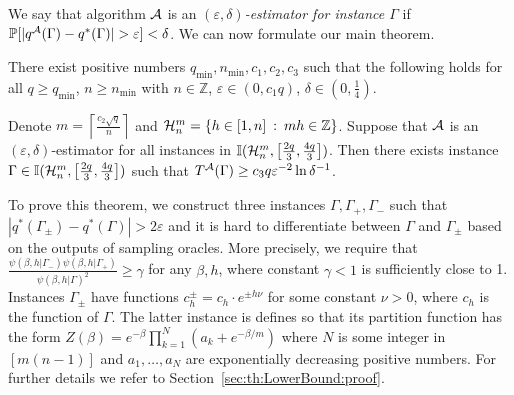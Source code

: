 \documentclass[final,12pt]{colt2018}
\def\P{{\mathbb P}}
\def\calA{{\cal A}}
\def\calH{{\cal H}}
\begin{document}
We say that algorithm $\calA$ is an {\em $(\varepsilon,\delta)$-estimator for instance $\Gamma$}
if $\P[|q^{\calA}(\Gamma)-q^\ast(\Gamma)|> \varepsilon]<\delta$. 
We can now formulate our main theorem.
\begin{theorem}\label{th:LowerBound}
There exist positive numbers $q_{\min},n_{\min},c_1,c_2,c_3$ such that the following holds for all 
$q\ge q_{\min}$,
$n\ge n_{\min}$ with $n\in\mathbb Z$, 
$\varepsilon\in(0,c_1 q)$, $\delta\in(0,\frac{1}{4})$.

Denote $m=\left\lceil \frac{c_2\sqrt{q}}{n} \right\rceil$ and $\calH_n^m=\{h\in[1,n]\::\:mh\in\mathbb Z\}$.
Suppose that $\calA$ is an $(\varepsilon,\delta)$-estimator for all instances in $\I(\calH_n^m,\left[\frac{2q}3,\frac{4q}3\right])$.
Then there exists instance $\Gamma\in\I(\calH_n^m,\left[\frac{2q}3,\frac{4q}3\right])$
such that $T^\calA(\Gamma)\ge c_3 q \varepsilon^{-2}\ln \delta^{-1} $.
\end{theorem}
To prove this theorem, we construct three instances $\Gamma,\Gamma_+,\Gamma_-$
such that $|q^\ast(\Gamma_{\pm})-q^\ast(\Gamma)|>2\varepsilon$
and it is hard to differentiate between $\Gamma$ and $\Gamma_{\pm}$ based on the outputs of sampling oracles.
More precisely, we require that
$
\frac{\psi(\beta,h|\Gamma_-)\psi(\beta,h|\Gamma_+)}{\psi(\beta,h|\Gamma)^2}\ge \gamma
$ for any $\beta,h$, where constant $\gamma<1$ is sufficiently close to 1.
Instances $\Gamma_\pm$ have functions $c^{\pm}_h  =  c_{h}\cdot e^{\pm h\nu}$
for some constant $\nu>0$, where $c_h$ is the function of $\Gamma$.
The latter instance is  defines  so that its  partition function has the form
$Z(\beta)=e^{-\beta}\prod_{k=1}^{N} (a_k+e^{-\beta/m})$
where $N$ is some integer in $[m(n-1)]$ and $a_1,\ldots,a_N$ are exponentially decreasing positive numbers. 
For further details we refer to Section~\ref{sec:th:LowerBound:proof}.





\end{document}
